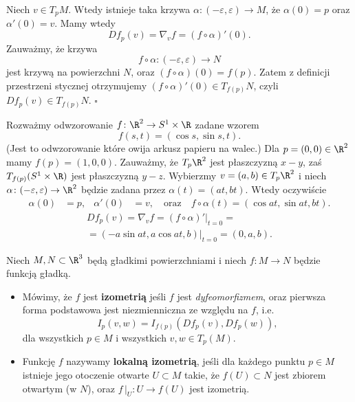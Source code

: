 \begin{frame}[<+->]

Niech $v\in T_pM$. Wtedy istnieje taka krzywa $\alpha\colon (-\varepsilon,\varepsilon)\to M$, że $\alpha(0)=p$ oraz $\alpha'(0)=v$. Mamy wtedy \[Df_p(v)=\nabla_v f=(f\circ \alpha)'(0).\]
\pause Zauważmy, że krzywa \[f\circ\alpha\colon (-\varepsilon,\varepsilon)\to N\] jest krzywą na powierzchni $N$, oraz $(f\circ \alpha)(0)=f(p)$. \pause Zatem z definicji przestrzeni stycznej otrzymujemy $(f\circ \alpha)'(0)\in T_{f(p)}N$, czyli $Df_p(v)\in T_{f(p)}N$.
\hfill $\square$

\end{frame}
\begin{frame}

\begin{przyklad}\label{ex:differential}
Rozważmy odwzorowanie $f\colon \R^2\to S^1\times \R$ zadane wzorem \[f(s,t)=(\cos s,\sin s,t).\]
(Jest to odwzorowanie które owija arkusz papieru na walec.) \pause Dla $p=(0,0)\in \R^2$ mamy $f(p)=(1,0,0)$. Zauważmy, że $T_p\R^2$ jest płaszczyzną $x-y$, zaś $T_{f(p)}(S^1\times \R)$ jest płaszczyzną $y-z$.
\pause Wybierzmy $v=(a,b)\in T_p\R^2$ i niech $\alpha\colon (-\varepsilon,\varepsilon)\to\R^2$ będzie zadana przez $\alpha(t)=(at,bt)$. Wtedy oczywiście
\begin{align*}
\alpha(0)&=p, &
\alpha'(0)&=v, \quad\text{oraz}\quad
f\circ \alpha (t)=(\cos at,\sin at, bt).
\end{align*}\pause
\begin{multline*}
Df_p(v)=\nabla_v f=(f\circ \alpha)'\big|_{t=0}=\\=(-a\sin at,a\cos at, b)\big|_{t=0}=(0,a,b).
\end{multline*}
\end{przyklad}

\end{frame}
\begin{frame}[<+->]

\begin{definicja}
Niech $M,N\subset \R^3$ będą gładkimi powierzchniami i niech $f\colon M\to N$ będzie funkcją gładką.
\begin{itemize}
\item Mówimy, że $f$ jest \textbf{izometrią} jeśli $f$ jest \emph{dyfeomorfizmem}, oraz pierwsza forma podstawowa jest niezmienniczna ze względu na $f$, i.e. \[I_p(v,w)=I_{f(p)}(Df_p(v),Df_p(w)),\] dla wszystkich $p\in M$ i wszystkich $v,w\in T_p(M)$.

\item Funkcję $f$ nazywamy \textbf{lokalną izometrią}, jeśli dla każdego punktu $p\in M$ istnieje jego otoczenie otwarte $U\subset M$ takie, że $f(U)\subset N$ jest zbiorem otwartym (w $N$), oraz $f\,\big|_U\colon U\to f(U)$ jest izometrią.
\end{itemize}

\end{definicja}
\end{frame}
